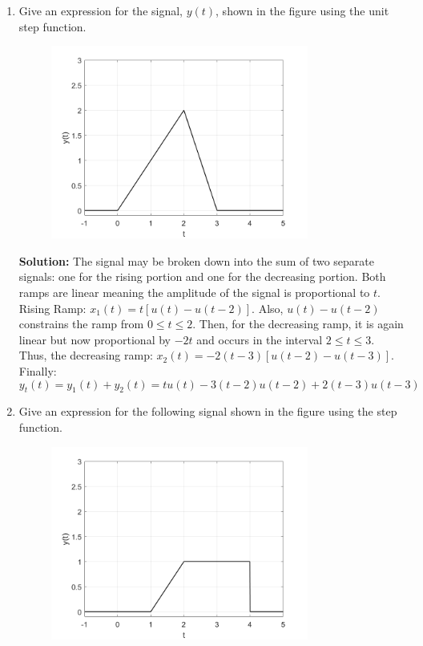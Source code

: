 \documentclass[12pt]{article}
\newenvironment{solution}{\vspace{2mm}\color{blue}\textbf{Solution: }}{\color{black}}
\begin{document}
\begin{enumerate}[\qquad 1)]
    \item Give an expression for the signal, $y(t)$, shown in the figure using the unit step function.

    \begin{figure}[htbp]
        \centering
        \includegraphics[width=0.8\textwidth]{images/problem3.png}
        \label{fig:Problem2}
    \end{figure}


    \begin{solution}
         The signal may be broken down into the sum of two separate signals: one for the rising portion and one for the decreasing portion. Both ramps are linear meaning the amplitude of the signal is proportional to $t$. Rising Ramp: $x_1(t) = t[u(t) - u(t-2)]$. Also, $u(t) - u(t-2)$ constrains the ramp from $0\leq t \leq 2$. Then, for the decreasing ramp, it is again linear but now proportional by $-2t$ and occurs in the interval $2 \leq t \leq 3$. Thus, the decreasing ramp: $x_2(t) = -2(t-3)[u(t-2) - u(t-3)]$. Finally: \[y_t(t) = y_1(t) + y_2(t) = tu(t) - 3(t-2)u(t-2) + 2(t-3)u(t-3)\]
    \end{solution}

    \newpage


    \item Give an expression for the following signal shown in the figure using the step function.
    
    \begin{figure}[htbp]
        \centering
        \includegraphics[width=0.8\textwidth]{images/problem4.png}
        \label{fig:Problem3}
    \end{figure} 


\end{enumerate}
\end{document}
